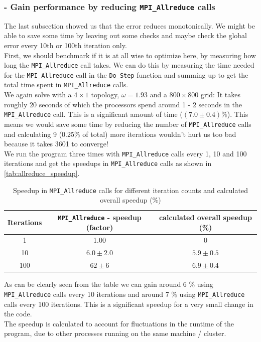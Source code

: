 \subsubsection{ - Gain performance by reducing \texttt{MPI\_Allreduce} calls}
The last subsection showed us that the error reduces monotonically. We might be able to save some time by leaving out some checks and maybe check the global error every 10th or 100th iteration only.\\ First, we should benchmark if it is at all wise to optimize here, by measuring how long the \texttt{MPI\_Allreduce} call takes. We can do this by measuring the time needed for the \texttt{MPI\_Allreduce} call in the \texttt{Do\_Step} function and summing up to get the total time spent in \texttt{MPI\_Allreduce} calls.\\
We again solve with a $4 \times 1$ topology, $\omega = 1.93$ and a $800 \times 800$ grid: It takes roughly $20$ seconds of which the processors spend around 1 - 2 seconds in the \texttt{MPI\_Allreduce} call. This is a significant amount of time ($(7.0 \pm 0.4)$\%). This means we would save some time by reducing the number of \texttt{MPI\_Allreduce} calls and calculating 9 (0.25\% of total) more iterations wouldn't hurt us too bad because it takes 3601 to converge!\\
We run the program three times with \texttt{MPI\_Allreduce} calls every 1, 10 and 100 iterations and get the speedups in \texttt{MPI\_Allreduce} calls as shown in \autoref{tab:allreduce_speedup}.
\begin{table}[H]
    \centering
    \caption{Speedup in \texttt{MPI\_Allreduce} calls for different iteration counts and calculated overall speedup (\%)}
    \label{tab:allreduce_speedup}
    \begin{tabular}{|c|c|c|}
        \hline
        Iterations & \texttt{MPI\_Allreduce} - speedup (factor) & calculated overall speedup (\%)\\\hline
        1  & 1.00 & 0\\\hline
        10 & $6.0 \pm 2.0$ & $ 5.9 \pm 0.5$\\\hline
        100& $62 \pm 6$    & $ 6.9 \pm 0.4$\\\hline
    \end{tabular}
\end{table}
As can be clearly seen from the table we can gain around 6 \% using \texttt{MPI\_Allreduce} calls every 10 iterations and around 7 \% using \texttt{MPI\_Allreduce} calls every 100 iterations. This is a significant speedup for a very small change in the code.\\
 The speedup is calculated to account for fluctuations in the runtime of the program, due to other processes running on the same machine / cluster. 


